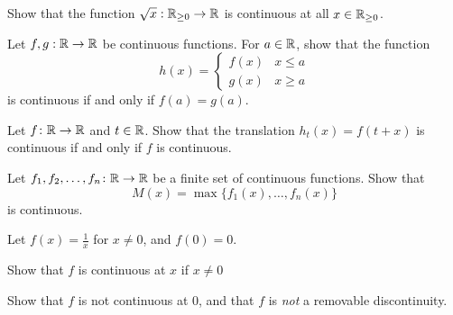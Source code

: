 \documentclass[../notes.tex]{subfiles}
\begin{document}
\begin{homework}
    Show that the function $\sqrt{x}: \mathbb R_{\geq 0}\to \mathbb R$ is continuous at all $x\in \mathbb R_{\geq 0}$. 
\end{homework}

\begin{homework}
    Let $f, g:\mathbb R\to \mathbb R$ be continuous functions. For $a\in \mathbb R$, show that the function 
    \[ h(x)=\begin{cases}
        f(x) &x\leq a \\
        g(x) &x\geq a
    \end{cases}\]
    is continuous if and only if $f(a)=g(a)$. 
\end{homework}

\begin{homework}
    Let $f\colon\mathbb R\to \mathbb R$ and $t\in \mathbb R$. Show that the translation $h_t(x)=f(t+x)$ is continuous if and only if $f$ is continuous. 
\end{homework}

\begin{homework}
    Let $f_1, f_2, \dots, f_n \colon \mathbb R\to \mathbb R$ be a finite set of continuous functions. Show that 
    \[ M(x) = \max\{f_1(x), \dots, f_n(x)\}\]
    is continuous. 
\end{homework}

\begin{homework}
    Let $f(x)=\frac{1}{x}$ for $x\neq 0$, and $f(0)=0$.
    \begin{listalph}
        \item Show that $f$ is continuous at $x$ if $x\neq 0$
        \item Show that $f$ is not continuous at $0$, and that $f$ is \textit{not} a removable discontinuity. 
    \end{listalph}
\end{homework}
\end{document}
